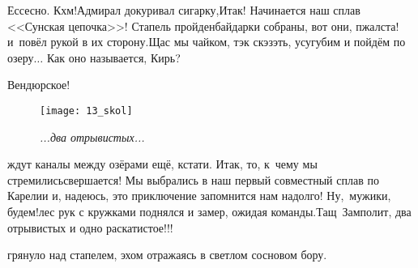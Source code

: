 \diagdash Ессесно. Кхм!\mdash Адмирал докуривал сигарку,\mdash Итак! Начинается наш сплав <<Сунская цепочка>>! Стапель пройден\mdash байдарки собраны, вот они, пжалста!\mdash и~повёл рукой в их сторону.\mdash Щас мы чайком, тэк скэзэть, усугубим и пойдём по озеру$\ldots$ Как оно называется, Кирь?

\par
\endgroup


\diagdash Вендюрское! 

\makebox[\linewidth-\parindent][s]{\diagdash Да, точно! По Вендюрскому озеру! Сегодня нас}

\begin{wrapfigure}[10]{l}{0.52\textwidth}
\setlength{\belowcaptionskip}{-10pt}
\centering
\texttt{[image: 13\_skol]}
\caption{\small\textit{...два отрывистых...}}
\end{wrapfigure}

\noindent ждут каналы между озёрами ещё, кстати. Итак, то, к~чему мы стремились\mdash свершается! Мы выбрались в наш первый совместный сплав по Карелии и, надеюсь, это приключение запомнится нам надолго! Ну,~мужики, будем!\mdash лес рук с кружками поднялся и замер, ожидая команды.\mdash Тащ~Замполит, два отрывистых и одно раскатистое!!!

\mdash грянуло над стапелем, эхом отражаясь в светлом сосновом бору.



	
%	
%	


